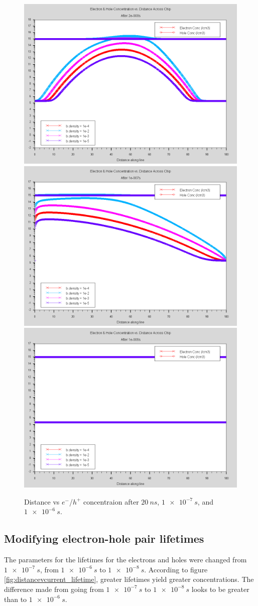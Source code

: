 \documentclass[12pt]{article}
\begin{document}
  \begin{figure}[htp]
    \centering
    \includegraphics[width=.3\textwidth]{density_after2e-008s}\hfill
    \includegraphics[width=.3\textwidth]{density_after1e-007s}\hfill
    \includegraphics[width=.3\textwidth]{density_after1e-006s}
    \caption{Distance vs $e^-$/$h^+$ concentraion after $\SI{20}{ns}$, $\SI{1e-7}{s}$, and $\SI{1e-6}{s}$.}
    \label{fig:distancevcurrent_density}
  \end{figure}

  \subsection{Modifying electron-hole pair lifetimes}

  The parameters for the lifetimes for the electrons and holes were changed from $\SI{1e-7}{s}$, from $\SI{1e-6}{s}$ to $\SI{1e-8}{s}$. According to figure \ref{fig:distancevcurrent_lifetime}, greater lifetimes yield greater concentrations. The difference made from going from $\SI{1e-7}{s}$ to $\SI{1e-8}{s}$ looks to be greater than to $\SI{1e-6}{s}$.
\end{document}
